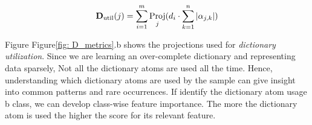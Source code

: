  
 \begin{equation}
    \label{eq:dict_util}
    \mathbf{D}_\textrm{util}(j)= \sum_{i=1}^m \operatorname*{Proj}_j(d_i \cdot \sum_{k=1}^n |\alpha_{j,k}|)  
\end{equation}

Figure Figure\ref{fig: D_metrics}.b shows the projections used for \emph{dictionary utilization}. Since we are learning an over-complete dictionary and representing data sparsely, Not all the dictionary atoms are used all the time. Hence, understanding which dictionary atoms are used by the sample can give insight into common patterns and rare occurrences. If identify the dictionary atom usage b class, we can develop class-wise feature importance. The more the dictionary atom is used the higher the score for its relevant feature.


